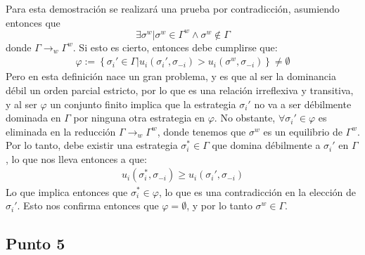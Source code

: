 \documentclass[11pt]{article}
\begin{document}
\begin{flushleft}
    Para esta demostración se realizará una prueba por contradicción, asumiendo entonces que
    $$\exists\sigma^w|\sigma^w\in\Gamma^{w}\land\sigma^w\notin\Gamma$$ donde $\Gamma \to_{w} \Gamma^{w}$.
    Si esto es cierto, entonces debe cumplirse que:
    \begin{align*}
        \varphi := \left\{\sigma_i'\in\Gamma|u_i(\sigma_i',\sigma_{-i})>u_i(\sigma^w,\sigma_{-i})\right\} \neq \emptyset
    \end{align*} 
    Pero en esta definición nace un gran problema, y es que al ser la dominancia débil un orden parcial estricto, por lo que es una relación
    irreflexiva y transitiva, y al ser $\varphi$ un conjunto finito implica que la estrategia $\sigma_i'$ no va a ser débilmente dominada en $\Gamma$
    por ninguna otra estrategia en $\varphi$. No obstante, $\forall\sigma_i'\in\varphi$ es eliminada en la reducción $\Gamma \to_{w} \Gamma^{w}$,
    donde tenemos que $\sigma^w$ es un equilibrio de $\Gamma^{w}$. Por lo tanto, debe existir una estrategia $\sigma^*_i\in\Gamma$ que domina
    débilmente a $\sigma_i'$ en $\Gamma$, lo que nos lleva entonces a que:
    \begin{align*}
        u_i(\sigma^*_i,\sigma_{-i})\geq u_i(\sigma_i',\sigma_{-i})
    \end{align*}
    Lo que implica entonces que $\sigma^*_i\in\varphi$, lo que es una contradicción en la elección de
    $\sigma_i'$. Esto nos confirma entonces que $\varphi = \emptyset$, y por lo tanto $\sigma^w\in\Gamma$.
\end{flushleft}

\subsection{Punto 5}
\end{document}
